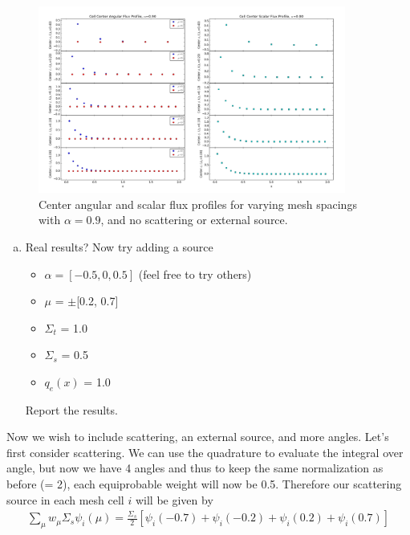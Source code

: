 \documentclass[10pt]{article}
\begin{document}
\begin{figure}[H]
    \centering
    \includegraphics[width=0.9\textwidth]{Figures/FluxProfile_a=09}
    \caption{Center angular and scalar flux profiles for varying mesh spacings with $\alpha = 0.9$, and no scattering or external source.}
    \label{fig7}
\end{figure}

%
%
%

\begin{enumerate}[(c)]
\item Real results? Now try adding a source
\begin{itemize}
\setlength\itemsep{0em}
\item $\alpha = [-0.5, 0, 0.5]$ (feel free to try others)
\item $\mu$ = $\pm$[0.2, 0.7] %
\item $\Sigma_t$ = 1.0
\item $\Sigma_s$ = 0.5
\item $q_e(x)$ = 1.0
\end{itemize}
Report the results.
\end{enumerate}

Now we wish to include scattering, an external source, and more angles. Let's first consider scattering. We can use the quadrature to evaluate the integral over angle, but now we have 4 angles and thus to keep the same normalization as before (= 2), each equiprobable weight will now be 0.5. Therefore our scattering source in each mesh cell $i$ will be given by
%
\begin{align*}
    \sum_\mu w_\mu \Sigma_s \psi_i(\mu) = \frac{\Sigma_s}{2}\left[\psi_i(-0.7) + \psi_i(-0.2) + \psi_i(0.2) + \psi_i(0.7)\right]
\end{align*}
\end{document}
